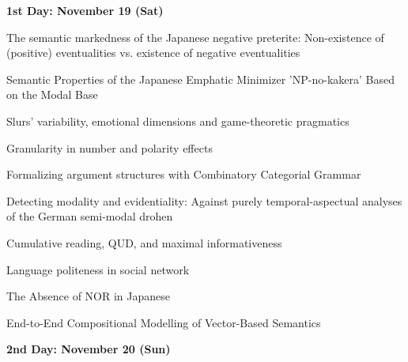 \documentclass[12pt]{jarticle}
\begin{document}
\noindent\textbf{\large 
1st Day: November 19 (Sat)
}\\






 
  
      {The semantic markedness of the Japanese negative preterite: Non-existence of (positive) eventualities vs. existence of negative eventualities}
      {}
  
      {Semantic Properties of the Japanese Emphatic Minimizer 'NP-no-kakera' Based on the Modal Base}
      {}
  
      {Slurs' variability, emotional dimensions and game-theoretic pragmatics}
      {}



 
  
      {Granularity in number and polarity effects}
      {}
  
      {Formalizing argument structures with Combinatory Categorial Grammar}
      {}
  
      {Detecting modality and evidentiality: Against purely temporal-aspectual analyses of the German semi-modal drohen}
      {}



 
  
      {Cumulative reading, QUD, and maximal informativeness}
      {}
  
      {Language politeness in social network}
      {}
  
      {The Absence of NOR in Japanese}
      {}




  
      {End-to-End Compositional Modelling of Vector-Based Semantics}
      {}




\noindent\textbf{\large 
2nd Day: November 20 (Sun)
}\\



\end{document}
